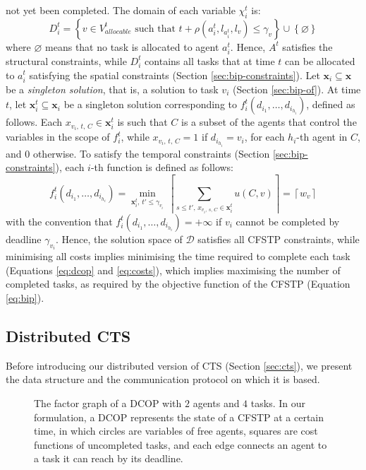 not yet been completed. The domain of each variable $\chi_i^t$ is:
\begin{equation}\label{eq:dyndcop-d}
    D_i^t = \left\{ v \in V^t_{allocable} \text{ such that } t + \rho(a_i^t,
    l_{a_i^t}, l_v) \leq \gamma_v \right\} \cup \left\{ \varnothing \right\}
\end{equation}
where $\varnothing$ means that no task is allocated to agent $a_i^t$. Hence, $A^t$
satisfies the structural constraints, while $D_i^t$ contains all tasks that at time $t$
can be allocated to $a_i^t$ satisfying the spatial constraints (Section
\ref{sec:bip-constraints}). Let $\bm{x}_i \subseteq \bm{x}$ be a \emph{singleton
solution}, that is, a solution to task $v_i$ (Section \ref{sec:bip-of}). At time $t$, let
$\bm{x}_i^t \subseteq \bm{x}_i$ be a singleton solution corresponding to
$f_i^t(d_{i_1}, \dots, d_{i_{h_i}})$, defined as follows. Each $x_{v_i, \, t,\, C} \in
\bm{x}_i^t$ is such that $C$ is a subset of the agents that control the variables in
the scope of $f_i^t$, while $x_{v_i,\, t,\, C} = 1$ if $d_{i_{h_i}} = v_i$, for each
$h_i$-th agent in $C$, and $0$ otherwise. To satisfy the temporal constraints (Section
\ref{sec:bip-constraints}), each $i$-th function is defined as follows:
\begin{equation}\label{eq:costs}
    f_i^t(d_{i_1}, \dots, d_{i_{h_i}}) =
    \min_{\bm{x}_i^t,\, t' \leq \gamma_{v_i}}\, \left\lceil \sum_{s \leq t',\,
    x_{v_i,\, s,\, C} \in \bm{x}_i^t} u(C, v) \right\rceil = \left\lceil w_v \right\rceil
\end{equation}
with the convention that $f_i^t(d_{i_1}, \dots, d_{i_{h_i}}) = +\infty$ if $v_i$ cannot be
completed by deadline $\gamma_{v_i}$. Hence, the solution space of $\mathcal{D}$ satisfies
all CFSTP constraints, while minimising all costs implies minimising the time required to
complete each task (Equations \ref{eq:dcop} and \ref{eq:costs}), which implies maximising
the number of completed tasks, as required by the objective function of the CFSTP
(Equation \ref{eq:bip}).

\subsection{Distributed CTS}

Before introducing our distributed version of CTS (Section \ref{sec:cts}), we present the
data structure and the communication protocol on which it is based.

\begin{figure}[t]
    \centering
    \begin{adjustbox}{width=.45\textwidth}
        
    \end{adjustbox}
    \caption[An example factor graph]{The factor graph of a DCOP with $2$ agents and $4$
        tasks. In our formulation, a DCOP represents the state of a CFSTP at a certain
        time, in which circles are variables of free agents, squares are cost functions of
        uncompleted tasks, and each edge connects an agent to a task it can reach by its
        deadline.}
    \label{fig:fgex}
\end{figure}

